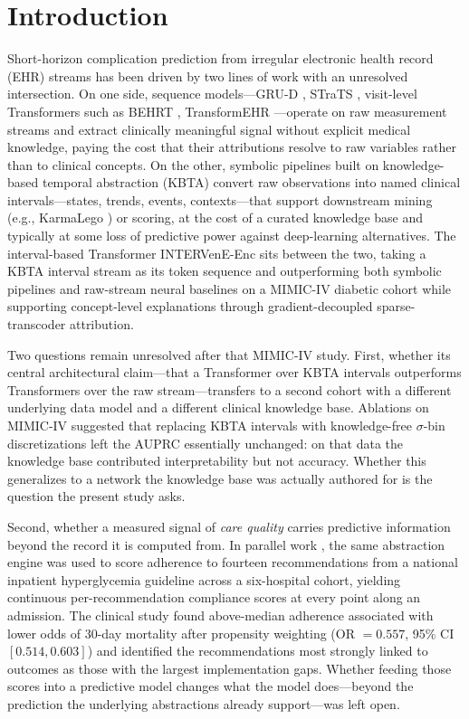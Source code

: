 \section{Introduction}
\label{sec:intro}

Short-horizon complication prediction from irregular electronic health record
(EHR) streams has been driven by two lines of work with an unresolved
intersection. On one side, sequence models---GRU-D
\citep{che2018recurrent}, STraTS \citep{tipirneni2022strats}, visit-level
Transformers such as BEHRT \citep{li2020behrt}, TransformEHR
\citep{yang2023transformehr}---operate on raw measurement streams and
extract clinically meaningful signal without explicit medical knowledge,
paying the cost that their attributions resolve to raw variables rather
than to clinical concepts. On the other, symbolic pipelines built on
knowledge-based temporal abstraction (KBTA) \citep{shahar1997framework}
convert raw observations into named clinical intervals---states, trends,
events, contexts---that support downstream mining (e.g., KarmaLego
\citep{moskovitch2015karmalego}) or scoring, at the cost of a curated
knowledge base and typically at some loss of predictive power against
deep-learning alternatives. The interval-based Transformer INTERVenE-Enc
\citep{oded2027intervene} sits between the two, taking a KBTA interval
stream as its token sequence and outperforming both symbolic pipelines
and raw-stream neural baselines on a MIMIC-IV diabetic cohort while
supporting concept-level explanations through gradient-decoupled
sparse-transcoder attribution.

Two questions remain unresolved after that MIMIC-IV study. First, whether
its central architectural claim---that a Transformer over KBTA intervals
outperforms Transformers over the raw stream---transfers to a second cohort
with a different underlying data model and a different clinical knowledge
base. Ablations on MIMIC-IV \citep{oded2027intervene} suggested that
replacing KBTA intervals with knowledge-free $\sigma$-bin discretizations
left the AUPRC essentially unchanged: on that data the knowledge base
contributed interpretability but not accuracy. Whether this generalizes to
a network the knowledge base was actually authored for is the question the
present study asks.

Second, whether a measured signal of \emph{care quality} carries predictive
information beyond the record it is computed from. In parallel work
\citep{oded2027kineret-jbi}, the same abstraction engine was used to score
adherence to fourteen recommendations from a national inpatient
hyperglycemia guideline \citep{hochberg2023inpatient} across a
six-hospital cohort, yielding continuous per-recommendation compliance
scores at every point along an admission. The clinical study found
above-median adherence associated with lower odds of $30$-day mortality
after propensity weighting (OR $=0.557$, 95\% CI $[0.514, 0.603]$) and
identified the recommendations most strongly linked to outcomes as those
with the largest implementation gaps. Whether feeding those scores into a
predictive model changes what the model does---beyond the prediction the
underlying abstractions already support---was left open.

